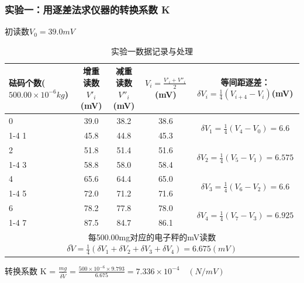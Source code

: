 \documentclass[]{../template/Report}%
\begin{document}
\begin{fullreportonly}
\subsubsection{实验一：用逐差法求仪器的转换系数 K}
初读数$V_0 = 39.0mV$
\begin{table}[H]
    \centering
    \caption{实验一数据记录与处理}
    \begin{tabular}{|p{6em}|c|c|c|c|}
        \hline
        \textbf{砝码个数($500.00 \times 10^{-6}kg$)} & \textbf{增重读数$V'_i$(mV)} & \textbf{减重读数$V''_i$(mV)} & $V_i = \frac{V'_i + V''_i}{2}$(mV) & \textbf{等间距逐差：$\delta V_i = \frac{1}{4}(V_{i+4} - V_i)$(mV)}  \\
        \hline
        0 & 39.0 & 38.2 & 38.6 & \multirow{2}{*}{$\delta V_1=\frac{1}{4}(V_4-V_0) = 6.6$} \\
        \cline{1-4}
        1 & 45.8 & 44.8 & 45.3 &  \\
        \hline
        2 & 51.8 & 51.4 & 51.6 & \multirow{2}{*}{$\delta V_2=\frac{1}{4}(V_5-V_1) = 6.575$} \\
        \cline{1-4}
        3 & 58.8 & 58.0 & 58.4 &  \\
        \hline
        4 & 65.6 & 64.4 & 65.0 & \multirow{2}{*}{$\delta V_3=\frac{1}{4}(V_6-V_2) = 6.6$} \\
        \cline{1-4}
        5 & 72.0 & 71.2 & 71.6 &  \\
        \hline
        6 & 78.2 & 77.8 & 78.0 & \multirow{2}{*}{$\delta V_4=\frac{1}{4}(V_7-V_3) = 6.925$} \\
        \cline{1-4}
        7 & 87.5 & 84.7 & 86.1 &  \\
        \hline
        \multicolumn{5}{|c|}{每500.00mg对应的电子秤的mV读数$\bar{\delta V} = \frac{1}{4}(\delta V_1 + \delta V_2 + \delta V_3 + \delta V_4) = 6.675(mV)$}  \\
        \hline
    \end{tabular}
\end{table}
转换系数 K = $\frac{mg}{\bar{\delta V}} = \frac{500 \times 10^{-6} \times 9.793}{6.675} = 7.336 \times 10^{-4} \quad (N/mV)$


\end{fullreportonly}
\end{document}
